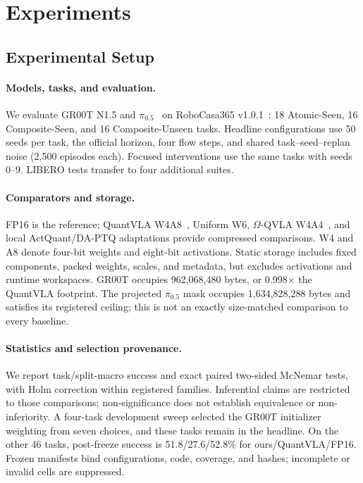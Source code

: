 \section{Experiments}
\label{sec:experiments}

\subsection{Experimental Setup}
\label{sec:setup}

\paragraph{Models, tasks, and evaluation.}
We evaluate GR00T N1.5 and $\pi_{0.5}$~\cite{bjorck2025groot,intelligence2025pi05} on RoboCasa365 v1.0.1~\cite{nasiriany2026robocasa365}: 18 Atomic-Seen, 16 Composite-Seen, and 16 Composite-Unseen tasks. Headline configurations use 50 seeds per task, the official horizon, four flow steps, and shared task--seed--replan noise (2,500 episodes each). Focused interventions use the same tasks with seeds 0--9. LIBERO tests transfer to four additional suites.

\paragraph{Comparators and storage.}
FP16 is the reference; QuantVLA W4A8~\cite{zhang2026quantvla}, Uniform W6, $\Omega$-QVLA W4A4~\cite{wang2026omegaqvla}, and local ActQuant/DA-PTQ adaptations provide compressed comparisons. W4 and A8 denote four-bit weights and eight-bit activations. Static storage includes fixed components, packed weights, scales, and metadata, but excludes activations and runtime workspaces. GR00T occupies 962,068,480 bytes, or 0.998$\times$ the QuantVLA footprint. The projected $\pi_{0.5}$ mask occupies 1,634,828,288 bytes and satisfies its registered ceiling; this is not an exactly size-matched comparison to every baseline.

\paragraph{Statistics and selection provenance.}
We report task/split-macro success and exact paired two-sided McNemar tests, with Holm correction within registered families. Inferential claims are restricted to those comparisons; non-significance does not establish equivalence or non-inferiority. A four-task development sweep selected the GR00T initializer weighting from seven choices, and these tasks remain in the headline. On the other 46 tasks, post-freeze success is 51.8/27.6/52.8\% for ours/QuantVLA/FP16. Frozen manifests bind configurations, code, coverage, and hashes; incomplete or invalid cells are suppressed.

